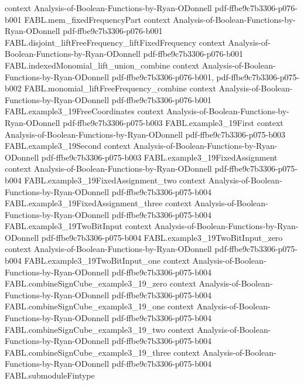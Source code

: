 \begin{theorem}
  {context}
  {Analysis-of-Boolean-Functions-by-Ryan-ODonnell}
  {pdf-ffbe9c7b3306-p076-b001}
\proofstep
  {FABL.mem_fixedFrequencyPart}
  {context}
  {Analysis-of-Boolean-Functions-by-Ryan-ODonnell}
  {pdf-ffbe9c7b3306-p076-b001}
\proofstep
  {FABL.disjoint_liftFreeFrequency_liftFixedFrequency}
  {context}
  {Analysis-of-Boolean-Functions-by-Ryan-ODonnell}
  {pdf-ffbe9c7b3306-p076-b001}
\proofstep
  {FABL.indexedMonomial_lift_union_combine}
  {context}
  {Analysis-of-Boolean-Functions-by-Ryan-ODonnell}
  {pdf-ffbe9c7b3306-p076-b001,
    pdf-ffbe9c7b3306-p075-b002}
\proofstep
  {FABL.monomial_liftFreeFrequency_combine}
  {context}
  {Analysis-of-Boolean-Functions-by-Ryan-ODonnell}
  {pdf-ffbe9c7b3306-p076-b001}
\proofstep
  {FABL.example3_19FreeCoordinates}
  {context}
  {Analysis-of-Boolean-Functions-by-Ryan-ODonnell}
  {pdf-ffbe9c7b3306-p075-b003}
\proofstep
  {FABL.example3_19First}
  {context}
  {Analysis-of-Boolean-Functions-by-Ryan-ODonnell}
  {pdf-ffbe9c7b3306-p075-b003}
\proofstep
  {FABL.example3_19Second}
  {context}
  {Analysis-of-Boolean-Functions-by-Ryan-ODonnell}
  {pdf-ffbe9c7b3306-p075-b003}
\proofstep
  {FABL.example3_19FixedAssignment}
  {context}
  {Analysis-of-Boolean-Functions-by-Ryan-ODonnell}
  {pdf-ffbe9c7b3306-p075-b004}
\proofstep
  {FABL.example3_19FixedAssignment_two}
  {context}
  {Analysis-of-Boolean-Functions-by-Ryan-ODonnell}
  {pdf-ffbe9c7b3306-p075-b004}
\proofstep
  {FABL.example3_19FixedAssignment_three}
  {context}
  {Analysis-of-Boolean-Functions-by-Ryan-ODonnell}
  {pdf-ffbe9c7b3306-p075-b004}
\proofstep
  {FABL.example3_19TwoBitInput}
  {context}
  {Analysis-of-Boolean-Functions-by-Ryan-ODonnell}
  {pdf-ffbe9c7b3306-p075-b004}
\proofstep
  {FABL.example3_19TwoBitInput_zero}
  {context}
  {Analysis-of-Boolean-Functions-by-Ryan-ODonnell}
  {pdf-ffbe9c7b3306-p075-b004}
\proofstep
  {FABL.example3_19TwoBitInput_one}
  {context}
  {Analysis-of-Boolean-Functions-by-Ryan-ODonnell}
  {pdf-ffbe9c7b3306-p075-b004}
\proofstep
  {FABL.combineSignCube_example3_19_zero}
  {context}
  {Analysis-of-Boolean-Functions-by-Ryan-ODonnell}
  {pdf-ffbe9c7b3306-p075-b004}
\proofstep
  {FABL.combineSignCube_example3_19_one}
  {context}
  {Analysis-of-Boolean-Functions-by-Ryan-ODonnell}
  {pdf-ffbe9c7b3306-p075-b004}
\proofstep
  {FABL.combineSignCube_example3_19_two}
  {context}
  {Analysis-of-Boolean-Functions-by-Ryan-ODonnell}
  {pdf-ffbe9c7b3306-p075-b004}
\proofstep
  {FABL.combineSignCube_example3_19_three}
  {context}
  {Analysis-of-Boolean-Functions-by-Ryan-ODonnell}
  {pdf-ffbe9c7b3306-p075-b004}
\proofstep
  {FABL.submoduleFintype}

\end{theorem}
